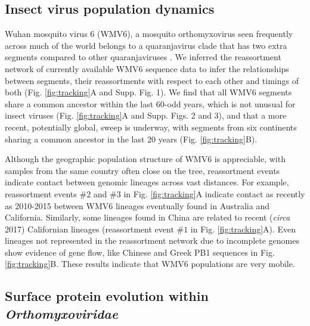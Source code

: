 \documentclass[11pt,twocolumn]{article}
\begin{document}
\subsection{Insect virus population dynamics}

Wuhan mosquito virus 6 (WMV6), a mosquito orthomyxovirus seen frequently across much of the world \citep{pettersson_meta-transcriptomic_2019,li_unprecedented_2015,shi_high-resolution_2017} belongs to a quaranjavirus clade that has two extra segments compared to other quaranjaviruses \citep{batson_single_2021}.
We inferred the reassortment network \citep{muller_bayesian_2020} of currently available WMV6 sequence data to infer the relationships between segments, their reassortments with respect to each other and timings of both (Fig. \ref{fig:tracking}A and Supp. Fig. 1).
We find that all WMV6 segments share a common ancestor within the last 60-odd years, which is not unusual for insect viruses \citep{webster_discovery_2015} (Fig. \ref{fig:tracking}A and Supp. Figs. 2 and 3), and that a more recent, potentially global, sweep is underway, with segments from six continents sharing a common ancestor in the last 20 years (Fig. \ref{fig:tracking}B).



Although the geographic population structure of WMV6 is appreciable, with samples from the same country often close on the tree, reassortment events indicate contact between genomic lineages across vast distances.
For example, reassortment events $\#2$ and $\#3$ in Fig. \ref{fig:tracking}A indicate contact as recently as 2010-2015 between WMV6 lineages eventually found in Australia and California.
Similarly, some lineages found in China are related to recent (\textit{circa} 2017) Californian lineages (reassortment event $\#1$ in Fig. \ref{fig:tracking}A).
Even lineages not represented in the reassortment network due to incomplete genomes show evidence of gene flow, like Chinese and Greek PB1 sequences in Fig. \ref{fig:tracking}B.
These results indicate that WMV6 populations are very mobile.



\subsection{Surface protein evolution within \textit{Orthomyxoviridae}}
\end{document}
